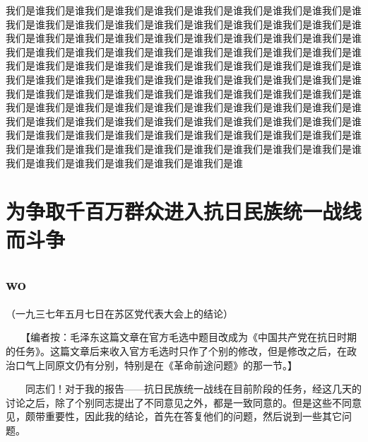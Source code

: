 \documentclass[twocolumn]{cvertbook}
\begin{document}
我们是谁我们是谁我们是谁我们是谁我们是谁我们是谁我们是谁我们是谁我们是谁我们是谁我们是谁我们是谁我们是谁我们是谁我们是谁我们是谁我们是谁我们是谁我们是谁我们是谁我们是谁我们是谁我们是谁我们是谁我们是谁我们是谁我们是谁我们是谁我们是谁我们是谁我们是谁我们是谁我们是谁我们是谁我们是谁我们是谁我们是谁我们是谁我们是谁我们是谁我们是谁我们是谁我们是谁我们是谁我们是谁我们是谁我们是谁我们是谁我们是谁我们是谁我们是谁我们是谁我们是谁我们是谁我们是谁我们是谁我们是谁我们是谁我们是谁我们是谁我们是谁我们是谁我们是谁我们是谁我们是谁我们是谁我们是谁我们是谁我们是谁我们是谁我们是谁我们是谁我们是谁我们是谁我们是谁我们是谁我们是谁我们是谁我们是谁我们是谁我们是谁我们是谁我们是谁我们是谁我们是谁我们是谁我们是谁我们是谁我们是谁我们是谁我们是谁我们是谁我们是谁我们是谁我们是谁我们是谁我们是谁我们是谁我们是谁我们是谁我们是谁我们是谁我们是谁我们是谁我们是谁
\part{为争取千百万群众进入抗日民族统一战线而斗争}
\chapter{wo}
（一九三七年五月七日在苏区党代表大会上的结论）

　　【编者按：毛泽东这篇文章在官方毛选中题目改成为《中国共产党在抗日时期的任务》。这篇文章后来收入官方毛选时只作了个别的修改，但是修改之后，在政治口气上同原文仍有分别，特别是在《革命前途问题》的那一节。】


　　同志们！对于我的报告——抗日民族统一战线在目前阶段的任务，经这几天的讨论之后，除了个别同志提出了不同意见之外，都是一致同意的。但是这些不同意见，颇带重要性，因此我的结论，首先在答复他们的问题，然后说到一些其它问题。

\end{document}

